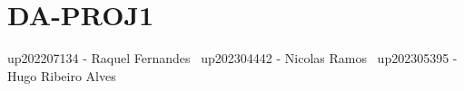 \chapter{DA-\/\+PROJ1}
\hypertarget{md_README}{}\label{md_README}
\label{md_README_autotoc_md1}%
%


up202207134 -\/ Raquel Fernandes~\newline
 up202304442 -\/ Nicolas Ramos~\newline
 up202305395 -\/ Hugo Ribeiro Alves 